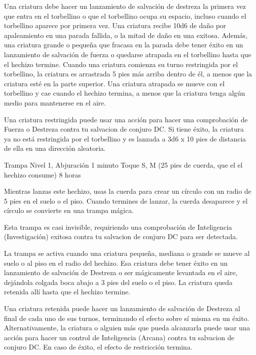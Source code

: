 \documentclass[a4paper,twocolumn,openany,10pt]{dndbook}
\begin{document}
	Una criatura debe hacer un lanzamiento de salvación de destreza la primera vez que entra en el torbellino o que el
	torbellino ocupa su espacio, incluso cuando el torbellino aparece por primera vez. Una criatura recibe 10d6 de daño por
	apaleamiento en una parada fallida, o la mitad de daño en una exitosa. Además, una criatura grande o pequeña que fracasa en
	la parada debe tener éxito en un lanzamiento de salvación de fuerza o quedarse atrapada en el torbellino hasta que el
	hechizo termine. Cuando una criatura comienza su turno restringida por el torbellino, la criatura es arrastrada 5 pies más
	arriba dentro de él, a menos que la criatura esté en la parte superior. Una criatura atrapada se mueve con el torbellino y
	cae cuando el hechizo termina, a menos que la criatura tenga algún medio para mantenerse en el aire.
	
	Una criatura restringida puede usar una acción para hacer una comprobación de Fuerza o Destreza contra tu salvacion de
	conjuro DC. Si tiene éxito, la criatura ya no está restringida por el torbellino y es lanzada a 3d6 x 10 pies de distancia
	de ella en una dirección aleatoria.

\spellheader%
	{Trampa}
	{Nivel 1, Abjuración}
	{1 minuto}
	{Toque}
	{S, M (25 pies de cuerda, que el el hechizo consume)}
	{8 horas}
	
	Mientras lanzas este hechizo, usas la cuerda para crear un círculo con un radio de 5 pies en el suelo o el piso. Cuando
	termines de lanzar, la cuerda desaparece y el círculo se convierte en una trampa mágica.
	
	Esta trampa es casi invisible, requiriendo una comprobación de Inteligencia (Investigación) exitosa contra tu salvacion de
	conjuro DC para ser detectada.
	
	La trampa se activa cuando una criatura pequeña, mediana o grande se mueve al suelo o al piso en el radio del hechizo. Esa
	criatura debe tener éxito en un lanzamiento de salvación de Destreza o ser mágicamente levantada en el aire, dejándola
	colgada boca abajo a 3 pies del suelo o el piso. La criatura queda retenida allí hasta que el hechizo termine. 
	
	Una criatura retenida puede hacer un lanzamiento de salvación de Destreza al final de cada uno de sus turnos, terminando el
	efecto sobre sí misma en un éxito. Alternativamente, la criatura o alguien más que pueda alcanzarla puede usar una acción
	para hacer un control de Inteligencia (Arcana) contra tu salvacion de conjuro DC. En caso de éxito, el efecto de restricción
	termina.
	
\end{document}
